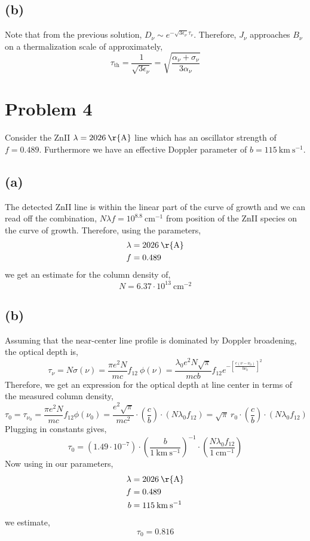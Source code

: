 \documentclass[12pt]{article}
\begin{document}
\subsection*{(b)}

Note that from the previous solution, $D_\nu \sim e^{-\sqrt{3 \epsilon_\nu} \tau_\nu}$. Therefore, $J_\nu$ approaches $B_\nu$ on a thermalization scale of approximately,
\[ \tau_{\text{th}} = \frac{1}{\sqrt{3 \epsilon_\nu}} = \sqrt{\frac{\alpha_\nu + \sigma_\nu}{3 \alpha_\nu}} \]

\section{Problem 4}

Consider the ZnII $\lambda = 2026 \: \mathrm{\r{A}}$ line which has an oscillator strength of $f = 0.489$. Furthermore we have an effective Doppler parameter of $b = 115 \: \mathrm{km} \: \mathrm{s}^{-1}$.

\subsection*{(a)}

The detected ZnII line is within the linear part of the curve of growth and we can read off the combination, $N \lambda f = 10^{8.8} \: \mathrm{cm}^{-1}$ from position of the ZnII species on the curve of growth. Therefore, using the parameters,
\begin{align*}
\lambda & = 2026 \: \mathrm{\r{A}}
\\
f & = 0.489
\end{align*}
we get an estimate for the column density of,
\[ N = 6.37 \cdot 10^{13} \: \mathrm{cm}^{-2} \] 

\subsection*{(b)}

Assuming that the near-center line profile is dominated by Doppler broadening, the optical depth is,
\[ \tau_\nu = N \sigma(\nu) = \frac{\pi e^2 N}{mc} f_{12} \: \phi(\nu) = \frac{\lambda_0 e^2 N \sqrt{\pi}}{mc b} f_{12} e^{-\left[ \frac{c(\nu - \nu_0)}{b \nu_0} \right]^2} \]
Therefore, we get an expression for the optical depth at line center in terms of the measured column density,
\[ \tau_0 = \tau_{\nu_0} = \frac{\pi e^2 N}{mc} f_{12} \phi(\nu_0) = \frac{e^2 \sqrt{\pi}}{m c^2} \cdot \left( \frac{c}{b} \right) \cdot (N \lambda_0 f_{12}) = \sqrt{\pi} \: r_0 \cdot \left( \frac{c}{b} \right) \cdot (N \lambda_0 f_{12})  \]
Plugging in constants gives,
\[ \tau_0 = (1.49 \cdot 10^{-7}) \cdot \left( \frac{b}{1 \: \mathrm{km} \: \mathrm{s}^{-1}} \right)^{-1} \cdot \left( \frac{N \lambda_0 f_{12}}{1 \: \mathrm{cm}^{-1}} \right) \]
Now using in our parameters,
\begin{align*}
\lambda & = 2026 \: \mathrm{\r{A}}
\\
f & = 0.489
\\
b & = 115 \: \mathrm{km} \: \mathrm{s}^{-1}
\end{align*}
we estimate,
\[ \tau_0 = 0.816 \]
\end{document}
